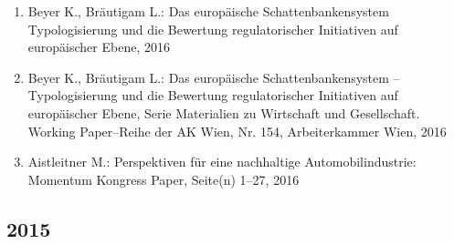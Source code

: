 \begin{enumerate}
	 \item Beyer K., Bräutigam L.: Das europäische Schattenbankensystem Typologisierung und die Bewertung regulatorischer Initiativen auf europäischer Ebene, 2016
	 \item Beyer K., Bräutigam L.: Das europäische Schattenbankensystem – Typologisierung und die Bewertung regulatorischer Initiativen auf europäischer Ebene, Serie Materialien zu Wirtschaft und Gesellschaft. Working Paper--Reihe der AK Wien, Nr. 154, Arbeiterkammer Wien, 2016
	 \item Aistleitner M.: Perspektiven für eine nachhaltige Automobilindustrie: Momentum Kongress Paper, Seite(n) 1--27, 2016
\end{enumerate}
\subsection*{2015}
